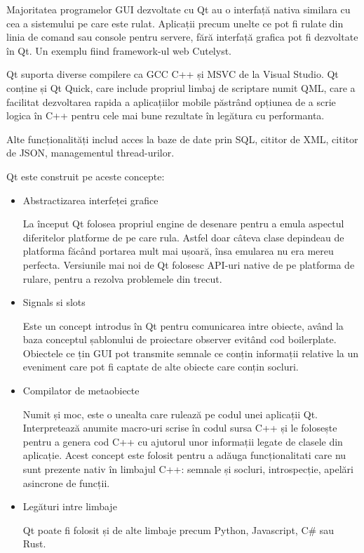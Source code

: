 Majoritatea programelor GUI dezvoltate cu Qt au o interfață nativa similara cu cea a sistemului pe care este rulat. 
Aplicații precum unelte ce pot fi rulate din linia de comand sau console pentru servere, fără interfață grafica pot fi 
dezvoltate în Qt. Un exemplu fiind framework-ul web Cutelyst.\newline

Qt suporta diverse compilere ca GCC C++ și MSVC de la Visual Studio. Qt conține și Qt Quick, care include propriul 
limbaj de scriptare numit QML, care a facilitat dezvoltarea rapida a aplicațiilor mobile păstrând opțiunea de a scrie 
logica în C++ pentru cele mai bune rezultate în legătura cu performanta.\newline

Alte funcționalități includ acces la baze de date prin SQL, cititor de XML, cititor de JSON, managementul thread-urilor.\newline

Qt este construit pe aceste concepte:
\begin{itemize}
    \item Abstractizarea interfeței grafice
    
    La început Qt folosea propriul engine de desenare pentru a emula aspectul diferitelor platforme de pe care rula. 
    Astfel doar câteva clase depindeau de platforma făcând portarea mult mai ușoară, însa emularea nu era mereu perfecta. 
    Versiunile mai noi de Qt folosesc API-uri native de pe platforma de rulare, pentru a rezolva problemele din trecut.

    \item Signals si slots
    
    Este un concept introdus în Qt pentru comunicarea intre obiecte, având la baza conceptul șablonului de proiectare observer 
    evitând cod boilerplate. Obiectele ce țin GUI pot transmite semnale ce conțin informații relative la un eveniment care pot 
    fi captate de alte obiecte care conțin socluri.

    \item Compilator de metaobiecte

    Numit și moc, este o unealta care rulează pe codul unei aplicații Qt. Interpretează anumite macro-uri scrise în codul 
    sursa C++ și le folosește pentru a genera cod C++ cu ajutorul unor informații legate de clasele din aplicație. 
    Acest concept este folosit pentru a adăuga funcționalitati care nu sunt prezente nativ în limbajul C++: semnale și socluri, 
    introspecție, apelări asincrone de funcții.

    \item Legături intre limbaje

    Qt poate fi folosit și de alte limbaje precum Python, Javascript, C\# sau Rust.
\end{itemize}

